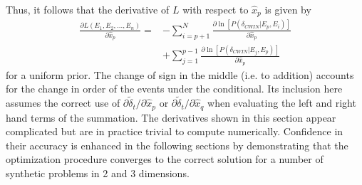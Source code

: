\documentclass[extra]{gji}
\begin{document}
Thus, it follows that the derivative of $L$ with respect to $\hat{x}_p$ is given by
\begin{equation}
\label{eq-derivative-Lstar-cwionly}
\begin{array}{ll}
\frac{\partial L(E_1, E_2, ..., E_n)}{\partial \hat{x}_p} = &
- \sum_{i=p+1}^{N} \frac{ \partial \ln \left[P(\delta_{CWIN}|E_p,E_i)\right]}{\partial \hat{x}_p} \\
 & + \sum_{j=1}^{p-1} \frac{ \partial \ln \left[P(\delta_{CWIN}|E_j,E_p)\right]}{\partial \hat{x}_p}
\end{array}
\end{equation}
%
for a uniform prior. The change of sign in the middle (i.e. to
addition) accounts for the change in order of the events under the
conditional. Its inclusion here assumes the correct use of $\partial
\widetilde{\delta}_t / \partial \hat{x}_p$ or $\partial
\widetilde{\delta}_t / \partial \hat{x}_q$ when evaluating the left
and right hand terms of the summation. The derivatives shown in this
section appear complicated but are in practice trivial to compute
numerically. Confidence in their accuracy is enhanced in the
following sections by demonstrating that the optimization procedure
converges to the correct solution for a number of synthetic problems
in 2 and 3 dimensions.


\clearpage









\label{lastpage}
\end{document}
